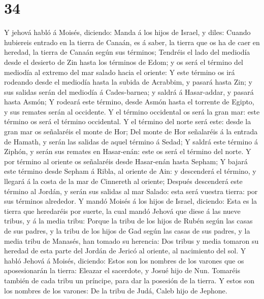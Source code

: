\hypertarget{section-33}{%
\section{34}\label{section-33}}

 Y jehová habló á Moisés, diciendo:  Manda á los
hijos de Israel, y diles: Cuando hubiereis entrado en la tierra de
Canaán, es á saber, la tierra que os ha de caer en heredad, la tierra de
Canaán según sus términos;  Tendréis el lado del mediodía
desde el desierto de Zin hasta los términos de Edom; y os será el
término del mediodía al extremo del mar salado hacia el oriente:
 Y este término os irá rodeando desde el mediodía hasta la
subida de Acrabbim, y pasará hasta Zin; y sus salidas serán del mediodía
á Cades-barnea; y saldrá á Hasar-addar, y pasará hasta Asmón;
 Y rodeará este término, desde Asmón hasta el torrente de
Egipto, y sus remates serán al occidente.  Y el término
occidental os será la gran mar: este término os será el término
occidental.  Y el término del norte será este: desde la gran
mar os señalaréis el monte de Hor;  Del monte de Hor
señalaréis á la entrada de Hamath, y serán las salidas de aquel término
á Sedad;  Y saldrá este término á Ziphón, y serán sus
remates en Hasar-enán: este os será el término del norte. 
Y por término al oriente os señalaréis desde Hasar-enán hasta Sepham;
 Y bajará este término desde Sepham á Ribla, al oriente de
Ain: y descenderá el término, y llegará á la costa de la mar de
Cinnereth al oriente;  Después descenderá este término al
Jordán, y serán sus salidas al mar Salado: esta será vuestra tierra: por
sus términos alrededor.  Y mandó Moisés á los hijos de
Israel, diciendo: Esta es la tierra que heredaréis por suerte, la cual
mandó Jehová que diese á las nueve tribus, y á la media tribu:
 Porque la tribu de los hijos de Rubén según las casas de
sus padres, y la tribu de los hijos de Gad según las casas de sus
padres, y la media tribu de Manasés, han tomado su herencia:
 Dos tribus y media tomaron su heredad de esta parte del
Jordán de Jericó al oriente, al nacimiento del sol.  Y
habló Jehová á Moisés, diciendo:  Estos son los nombres de
los varones que os aposesionarán la tierra: Eleazar el sacerdote, y
Josué hijo de Nun.  Tomaréis también de cada tribu un
príncipe, para dar la posesión de la tierra.  Y estos son
los nombres de los varones: De la tribu de Judá, Caleb hijo de Jephone.
